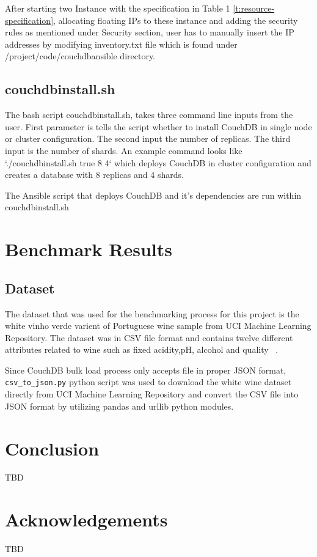 After starting two Instance  with the specification in Table 1
\ref{t:resource-specification}, allocating floating IPs to these
instance and adding the security rules as mentioned under Security
section, user has to manually insert the IP addresses by modifying
inventory.txt file which is found under /project/code/couchdbansible
directory.

\subsection{couchdbinstall.sh}

The bash script couchdbinstall.sh, takes three command line inputs
from the user. First parameter is tells the script whether to install
CouchDB in single node or cluster configuration. The second input the
number of replicas. The third input is the number of shards. An
example command looks like `./couchdbinstall.sh true 8 4` which
deploys CouchDB in cluster configuration and creates a database with 8
replicas and 4 shards.

The Ansible script that deploys CouchDB and it's dependencies are run
within couchdbinstall.sh

\section{Benchmark Results}
\subsection{Dataset}
The dataset that was used for the benchmarking process for this
project is the white vinho verde varient of Portuguese wine sample
from UCI Machine Learning Repository. The dataset was in CSV file
format and contains twelve different attributes related to wine such
as fixed acidity,pH, alcohol and quality ~\cite{www-WineQuality}. 

Since CouchDB bulk load process only accepts file in proper JSON
format, \verb|csv_to_json.py| python script was used to
download the white wine dataset directly from UCI Machine Learning
Repository and convert the CSV file into JSON format by utilizing
pandas and urllib python modules.

\section{Conclusion}
TBD
\section*{Acknowledgements}

TBD


 





